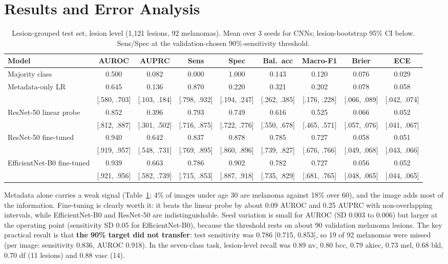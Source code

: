 \documentclass{article}
\newcommand{\ci}[2]{{\scriptsize[#1, #2]}}
\begin{document}
\section{Results and Error Analysis}
\begin{table}[t]
\caption{Lesion-grouped test set, lesion level (1{,}121 lesions, 92 melanomas). Mean over 3 seeds for
CNNs; lesion-bootstrap 95\% CI below. Sens/Spec at the validation-chosen 90\%-sensitivity threshold.}
\label{tab:main}
\centering
\footnotesize
\setlength{\tabcolsep}{3pt}
\begin{tabular}{lcccccccc}
\toprule
Model & AUROC & AUPRC & Sens & Spec & Bal.\ acc & Macro-F1 & Brier & ECE \\
\midrule
Majority class & 0.500 & 0.082 & 0.000 & 1.000 & 0.143 & 0.120 & 0.076 & 0.029 \\
Metadata-only LR & 0.645 & 0.136 & 0.870 & 0.220 & 0.321 & 0.202 & 0.078 & 0.058 \\
 & \ci{.580}{.703} & \ci{.103}{.184} & \ci{.798}{.932} & \ci{.194}{.247} & \ci{.262}{.385} & \ci{.176}{.228} & \ci{.066}{.089} & \ci{.042}{.074} \\
ResNet-50 linear probe & 0.852 & 0.396 & 0.793 & 0.749 & 0.616 & 0.525 & 0.066 & 0.052 \\
 & \ci{.812}{.887} & \ci{.301}{.502} & \ci{.716}{.875} & \ci{.722}{.776} & \ci{.550}{.678} & \ci{.465}{.571} & \ci{.057}{.076} & \ci{.041}{.067} \\
ResNet-50 fine-tuned & 0.940 & 0.642 & 0.837 & 0.878 & 0.785 & 0.727 & 0.058 & 0.051 \\
 & \ci{.919}{.957} & \ci{.548}{.731} & \ci{.769}{.895} & \ci{.860}{.896} & \ci{.739}{.827} & \ci{.676}{.766} & \ci{.049}{.068} & \ci{.043}{.066} \\
EfficientNet-B0 fine-tuned & 0.939 & 0.663 & 0.786 & 0.902 & 0.782 & 0.727 & 0.056 & 0.052 \\
 & \ci{.921}{.956} & \ci{.582}{.739} & \ci{.715}{.853} & \ci{.887}{.918} & \ci{.735}{.829} & \ci{.681}{.765} & \ci{.048}{.065} & \ci{.044}{.065} \\
\bottomrule
\end{tabular}
\vspace{-2mm}
\end{table}

Metadata alone carries a weak signal (Table~\ref{tab:main}; 4\% of images under age 30 are melanoma
against 18\% over 60), and the image adds most of the information. Fine-tuning is clearly worth it:
it beats the linear probe by about 0.09 AUROC and 0.25 AUPRC with non-overlapping intervals, while
EfficientNet-B0 and ResNet-50 are indistinguishable. Seed variation is small for AUROC (SD 0.003 to
0.006) but larger at the operating point (sensitivity SD 0.05 for EfficientNet-B0), because the
threshold rests on about 90 validation melanoma lesions. The key practical result is that \textbf{the
90\% target did not transfer}: test sensitivity was 0.786 \ci{0.715}{0.853}, so 19 of 92 melanomas
were missed (per image: sensitivity 0.836, AUROC 0.918). In the seven-class task, lesion-level recall
was 0.89 nv, 0.80 bcc, 0.79 akiec, 0.73 mel, 0.68 bkl, 0.70 df (11 lesions) and 0.88 vasc (14).
\end{document}
